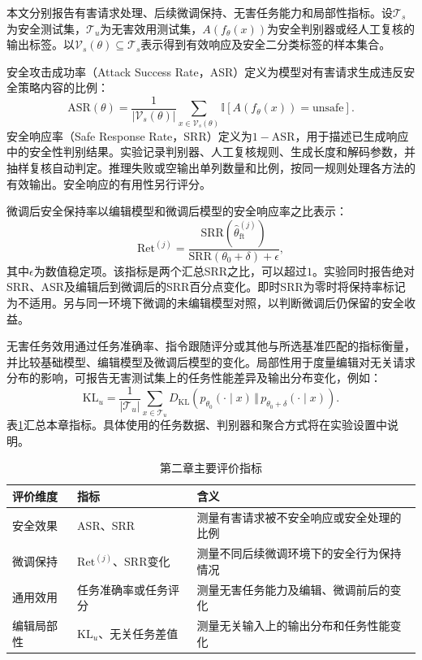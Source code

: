 本文分别报告有害请求处理、后续微调保持、无害任务能力和局部性指标。设$\mathcal{T}_{s}$为安全测试集，$\mathcal{T}_{u}$为无害效用测试集，$A(f_\theta(x))$为安全判别器或经人工复核的输出标签。以$\mathcal{V}_{s}(\theta)\subseteq\mathcal{T}_{s}$表示得到有效响应及安全二分类标签的样本集合。

安全攻击成功率（Attack Success Rate，ASR）定义为模型对有害请求生成违反安全策略内容的比例：
\begin{equation}
  \mathrm{ASR}(\theta)=
  \frac{1}{|\mathcal{V}_{s}(\theta)|}
  \sum_{x\in\mathcal{V}_{s}(\theta)}
  \mathbb{I}\!\left[A(f_\theta(x))=\mathrm{unsafe}\right].
  \label{eq:asr}
\end{equation}
安全响应率（Safe Response Rate，SRR）定义为$1-\mathrm{ASR}$，用于描述已生成响应中的安全性判别结果。实验记录判别器、人工复核规则、生成长度和解码参数，并抽样复核自动判定。推理失败或空输出单列数量和比例，按同一规则处理各方法的有效输出。安全响应的有用性另行评分。

微调后安全保持率以编辑模型和微调后模型的安全响应率之比表示：
\begin{equation}
  \mathrm{Ret}^{(j)}
  =\frac{\mathrm{SRR}(\widehat{\theta}_{\mathrm{ft}}^{(j)})}
  {\mathrm{SRR}(\theta_0+\delta)+\epsilon},
  \label{eq:retention}
\end{equation}
其中$\epsilon$为数值稳定项。该指标是两个汇总SRR之比，可以超过$1$。实验同时报告绝对SRR、ASR及编辑后到微调后的SRR百分点变化。即时SRR为零时将保持率标记为不适用。另与同一环境下微调的未编辑模型对照，以判断微调后仍保留的安全收益。

无害任务效用通过任务准确率、指令跟随评分或其他与所选基准匹配的指标衡量，并比较基础模型、编辑模型及微调后模型的变化。局部性用于度量编辑对无关请求分布的影响，可报告无害测试集上的任务性能差异及输出分布变化，例如：
\begin{equation}
  \mathrm{KL}_{u}
  =\frac{1}{|\mathcal{T}_{u}|}
  \sum_{x\in\mathcal{T}_{u}}
  D_{\mathrm{KL}}\!\left(
  p_{\theta_0}(\cdot\mid x)\,\Vert\,
  p_{\theta_0+\delta}(\cdot\mid x)
  \right).
  \label{eq:locality}
\end{equation}
表\ref{tab:ch2-metrics}汇总本章指标。具体使用的任务数据、判别器和聚合方式将在实验设置中说明。

\begin{table}[htbp]
  \centering
  \caption{第二章主要评价指标}
  \label{tab:ch2-metrics}
  \begin{tabular}{p{}p{}>{\raggedright\arraybackslash}p{}}
    \hline
    评价维度 & 指标 & 含义 \\ \hline
    安全效果 & ASR、SRR & 测量有害请求被不安全响应或安全处理的比例 \\ 
    微调保持 & $\mathrm{Ret}^{(j)}$、SRR变化 & 测量不同后续微调环境下的安全行为保持情况 \\
    通用效用 & 任务准确率或任务评分 & 测量无害任务能力及编辑、微调前后的变化 \\
    编辑局部性 & $\mathrm{KL}_{u}$、无关任务差值 & 测量无关输入上的输出分布和任务性能变化 \\
    \hline
  \end{tabular}
\end{table}

